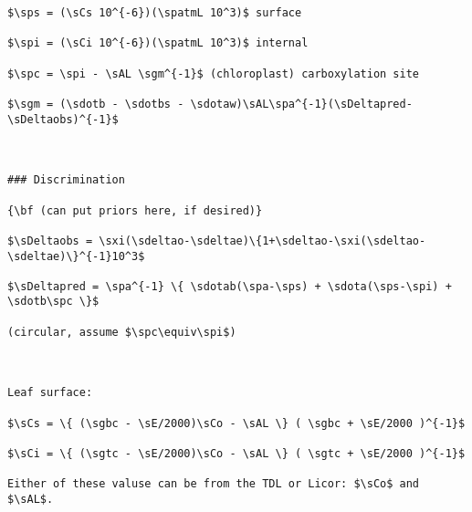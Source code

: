 \documentclass[]{article}
\begin{document}
\begin{verbatim}
$\sps = (\sCs 10^{-6})(\spatmL 10^3)$ surface

$\spi = (\sCi 10^{-6})(\spatmL 10^3)$ internal

$\spc = \spi - \sAL \sgm^{-1}$ (chloroplast) carboxylation site

$\sgm = (\sdotb - \sdotbs - \sdotaw)\sAL\spa^{-1}(\sDeltapred-\sDeltaobs)^{-1}$



### Discrimination

{\bf (can put priors here, if desired)}

$\sDeltaobs = \sxi(\sdeltao-\sdeltae)\{1+\sdeltao-\sxi(\sdeltao-\sdeltae)\}^{-1}10^3$

$\sDeltapred = \spa^{-1} \{ \sdotab(\spa-\sps) + \sdota(\sps-\spi) + \sdotb\spc \}$

(circular, assume $\spc\equiv\spi$)



Leaf surface:

$\sCs = \{ (\sgbc - \sE/2000)\sCo - \sAL \} ( \sgbc + \sE/2000 )^{-1}$

$\sCi = \{ (\sgtc - \sE/2000)\sCo - \sAL \} ( \sgtc + \sE/2000 )^{-1}$

Either of these valuse can be from the TDL or Licor: $\sCo$ and $\sAL$.
\end{verbatim}
\end{document}
